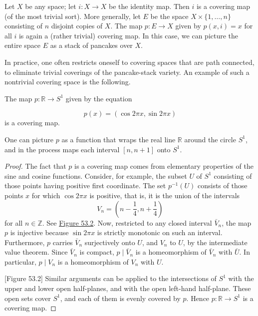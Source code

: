 \begin{centeredblock}
\begin{example}
\label{ex:\thesection.\theexample}
Let \(X\) be any space; let \(i : X \rightarrow X\) be the identity map. Then \(i\) is a covering map (of the most trivial sort). More generally, let \(E\) be the space \(X \times \{ 1,\ldots, n\}\) consisting of \(n\) disjoint copies of \(X\). The map \(p : E \rightarrow X\) given by \(p( {x,i}) = x\) for all \(i\) is again a (rather trivial) covering map. In this case, we can picture the entire space \(E\) as a stack of pancakes over \(X\).
\end{example}
\end{centeredblock}

In practice, one often restricts oneself to covering spaces that are path connected, to eliminate trivial coverings of the pancake-stack variety. An example of such a nontrivial covering space is the following.

\begin{theorem}
\label{thm:\thetheorem}
The map \(p : \mathbb{R} \rightarrow {S}^{1}\) given by the equation

\[
p(x) = ( {\cos {2\pi x},\sin {2\pi x}})
\]
is a covering map.
\end{theorem}

One can picture \(p\) as a function that wraps the real line \(\mathbb{R}\) around the circle \(S^{1}\), and in the process maps each interval \([ {n,n + 1}]\) onto \(S^{1}\).

\begin{proof}
The fact that \(p\) is a covering map comes from elementary properties of the sine and cosine functions. Consider, for example, the subset \(U\) of \(S^{1}\) consisting of those points having positive first coordinate. The set \(p^{-1}( U)\) consists of those points \(x\) for which \(\cos {2\pi x}\) is positive, that is, it is the union of the intervals
\[
V_{n} = ( {n - \frac{1}{4},n + \frac{1}{4}})
\]
for all \(n \in \mathbb{Z}\). See \hyperref[fig:53.2]{Figure 53.2}. Now, restricted to any closed interval \(\bar{V}_{n}\), the map \(p\) is injective because \(\sin {2\pi x}\) is strictly monotonic on such an interval. Furthermore, \(p\) carries \(\bar{V}_{n}\) surjectively onto \(U\), and \(V_{n}\) to \(U\), by the intermediate value theorem. Since \(\bar{V}_{n}\) is compact, \(p \mid {\bar{V}}_{n}\) is a homeomorphism of \(\bar{V}_{n}\) with \(\bar{U}\). In particular, \(p \mid {V}_{n}\) is a homeomorphism of \(V_{n}\) with \(U\).

[Figure 53.2]
Similar arguments can be applied to the intersections of \(S^{1}\) with the upper and lower open half-planes, and with the open left-hand half-plane. These open sets cover \(S^{1}\), and each of them is evenly covered by \(p\). Hence \(p : \mathbb{R} \rightarrow {S}^{1}\) is a covering map.
\end{proof}

